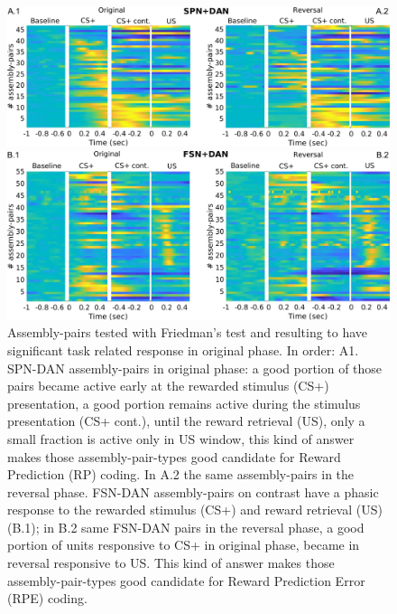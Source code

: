 \begin{figure}
     \centering
     \includegraphics[scale=0.36]{figures/HeatSPN_DAN.pdf}
     
     \vspace{1cm}
     
     \includegraphics[scale=0.36]{figures/HeatFSN_DAN.pdf}
     \caption{Assembly-pairs tested with Friedman's test and resulting to have significant task related response in original phase. In order: A1. SPN-DAN assembly-pairs in original phase: a good portion of those pairs became active early at the rewarded stimulus (CS+) presentation, a good portion remains active during the stimulus presentation (CS+ cont.), until the reward retrieval (US), only a small fraction is active only in US window, this kind of answer makes those assembly-pair-types good candidate for Reward Prediction (RP) coding. In A.2 the same assembly-pairs in the reversal phase. FSN-DAN assembly-pairs on contrast have a phasic response to the rewarded stimulus (CS+) and reward retrieval (US) (B.1); in B.2 same FSN-DAN pairs in the reversal phase, a good portion of units responsive to CS+ in original phase, became in reversal responsive to US. This kind of answer makes those assembly-pair-types good candidate for Reward Prediction Error (RPE) coding.}
     \label{fig:HeatPairsDan}
 \end{figure}
